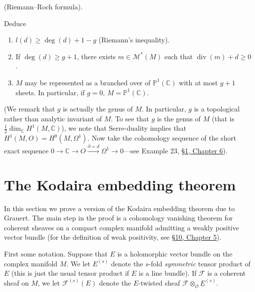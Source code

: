 \begin{enumerate}
(Riemann--Roch formula).

Deduce
\begin{enumerate}[label=\alph*)]
\item $l(d)\geq\deg(d)+1-g$ (Riemann's inequality).
\item If $\deg(d)\geq g+1$, there exists $m\in \mathcal{M}^*(M)$ such that $\operatorname{div}(m)+d\geq0$.
\item $M$ may be represented as a branched over of $\mathbb{P}^1(\mathbb{C})$ with at most $g+1$ sheets. In particular, if $g=0$, $M=\mathbb{P}^1(\mathbb{C})$.
\end{enumerate}
(We remark that $g$ is actually the genus of $M$. In particular, $g$ is a topological rather than analytic invariant of $M$. To see that $g$ is the genus of $M$ (that is $\tfrac12\dim_{\mathbb{C}}H^1(M,\mathbb{C})$), we note that Serre-duality implies that $H^1(M,O)=H^0(M,\Omega^1)$. Now take the cohomology sequence of the short exact sequence $0\to\mathbb{C}\to O\xrightarrow{\partial=d}\Omega^1\to0$---see Example 23, \hyperref[sec:6:1]{\S1, Chapter 6}).
\end{enumerate}

\section{The Kodaira embedding theorem}\label{sec:7:6}
In this section we prove a version of the Kodaira embedding theorem due to Grauert. The main step in the proof is a cohomology vanishing theorem for coherent sheaves on a compact complex manifold admitting a weakly positive vector bundle (for the definition of weak positivity, see \hyperref[sec:5:10]{\S10, Chapter 5}).

First some notation. Suppose that $E$ is a holomorphic vector bundle on the complex manifold $M$. We let $E^{(s)}$ denote the $s$-fold \emph{symmetric} tensor product of $E$ (this is just the usual tensor product if $E$ is a line bundle). If $\mathcal{F}$ is a coherent sheaf on $M$, we let $\mathcal{F}^{(s)}(E)$ denote the $E$-twisted sheaf $\mathcal{F}\otimes_{\mathcal{O}}\underline{E}^{(s)}$.

